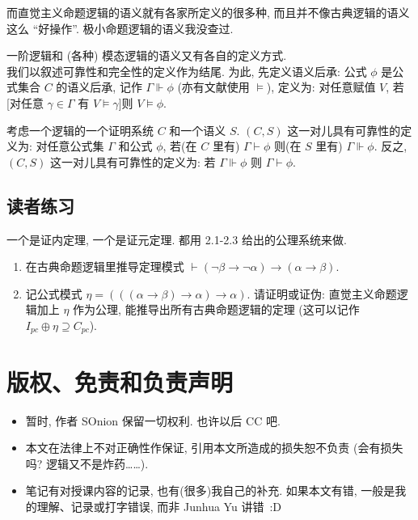 \documentclass{article}
\def\a{\alpha}
\def\b{\beta}
\def\c{\gamma}
\def\C{\Gamma}
\begin{document}
而直觉主义命题逻辑的语义就有各家所定义的很多种, 而且并不像古典逻辑的语义这么 ``好操作''. 极小命题逻辑的语义我没查过. 

一阶逻辑和 (各种) 模态逻辑的语义又有各自的定义方式.\\

我们以叙述可靠性和完全性的定义作为结尾. 为此, 先定义语义后承: 公式 $\phi$ 是公式集合 $C$ 的语义后承, 记作 $\C \Vdash \phi$ (亦有文献使用 $\models$), 定义为: 对任意赋值 $V$, 若[对任意 $\c \in \C$ 有 $V \models \c$]则 $V \models \phi$.

考虑一个逻辑的一个证明系统 $C$ 和一个语义 $S$. $(C,S)$ 这一对儿具有可靠性的定义为: 对任意公式集 $\C$ 和公式 $\phi$, 若(在 $C$ 里有) $\C \vdash \phi$ 则(在 $S$ 里有) $\C \Vdash \phi$. 反之, $(C,S)$ 这一对儿具有可靠性的定义为: 若 $\C \Vdash \phi$ 则 $\C \vdash \phi$.

\subsection{读者练习} 

一个是证内定理, 一个是证元定理. 都用 2.1-2.3 给出的公理系统来做.

\begin{enumerate}
\item 在古典命题逻辑里推导定理模式 $\vdash (\neg \b \to \neg \a) \to (\a \to \b)$.
\item 记公式模式 $\eta = (((\a \to \b) \to \a) \to \a)$. 请证明或证伪: 直觉主义命题逻辑加上 $\eta$ 作为公理, 能推导出所有古典命题逻辑的定理 (这可以记作 $I_{pc} \oplus \eta \supseteq C_{pc}$).
\end{enumerate}


\section{版权、免责和负责声明}
\begin{itemize}
\item 暂时, 作者 SOnion 保留一切权利. 也许以后 CC 吧.
\item 本文在法律上不对正确性作保证, 引用本文所造成的损失恕不负责 (会有损失吗? 逻辑又不是炸药……).
\item 笔记有对授课内容的记录, 也有(很多)我自己的补充. 如果本文有错, 一般是我的理解、记录或打字错误, 而非 Junhua Yu 讲错~:D
\end{itemize}
\end{document}
